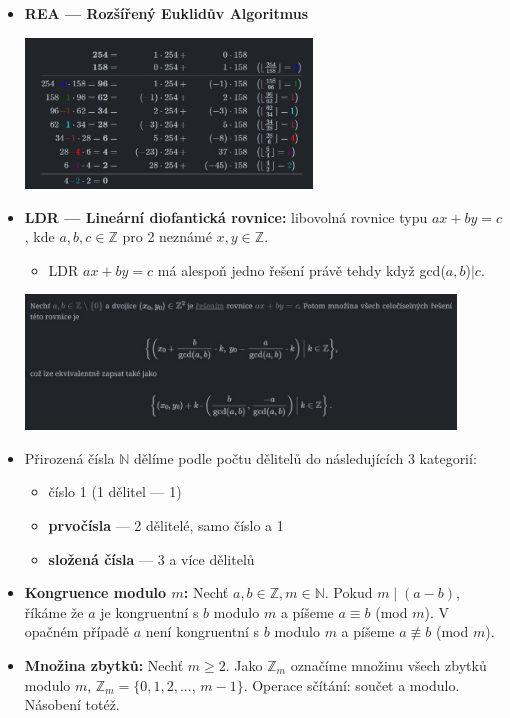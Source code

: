 \begin{itemize}
	\item \textbf{REA --- Rozšířený Euklidův Algoritmus}
	
	\includegraphics[width=0.6\textwidth]{img/SP-8_0.jpg}
	
	\item \textbf{LDR --- Lineární diofantická rovnice:} libovolná rovnice typu $ax+by=c$, kde $a,b,c \in \mathbb{Z}$ pro 2 neznámé $x, y \in \mathbb{Z}$.
	\begin{itemize}
		\item LDR $ax+by = c$ má alespoň jedno řešení právě tehdy když gcd($a,b$)$\mid c$.
	\end{itemize}
	
	\includegraphics[width=0.9\textwidth]{img/SP-8_1.jpg}
	
	\item Přirozená čísla $\mathbb{N}$ dělíme podle počtu dělitelů do následujících 3 kategorií:
	\begin{itemize}
		\item číslo 1 (1 dělitel --- 1)
		\item \textbf{prvočísla} --- 2 dělitelé, samo číslo a 1
		\item \textbf{složená čísla} --- 3 a více dělitelů
	\end{itemize}
	\newpage
	\item \textbf{Kongruence modulo $m$:} Nechť $a,b \in \mathbb{Z}, m \in \mathbb{N}$. Pokud $m \mid (a - b)$, říkáme že $a$ je kongruentní s $b$ modulo $m$ a píšeme $a \equiv b$ (mod $m$). V opačném případě $a$ není kongruentní s  $b$ modulo $m$ a píšeme $a \not\equiv b$ (mod $m$).
	
	\item \textbf{Množina zbytků:} Nechť $m \geq 2$. Jako $\mathbb{Z}_m$ označíme množinu všech zbytků modulo $m$, $\mathbb{Z}_m = \{0,1,2,...$, $m-1\}$. Operace sčítání: součet a modulo. Násobení totéž.
	

\end{itemize}
